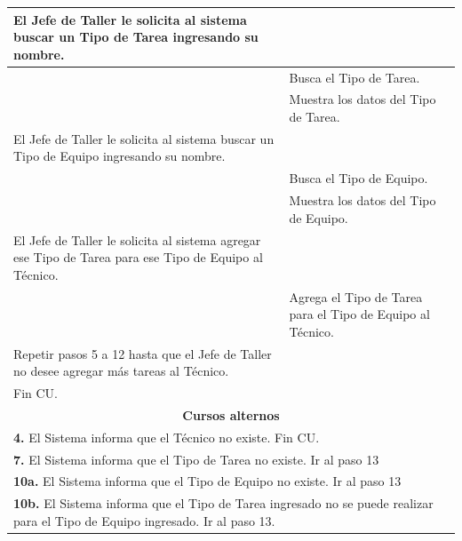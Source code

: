 \documentclass[12pt]{extarticle}
\begin{document}
\begin{spacing}{1.2}
\begin{longtable}{ |p{8cm}|p{8cm}| }
			\inc El Jefe de Taller le solicita al sistema buscar un Tipo de Tarea ingresando su nombre. & \\
			\hline
			& \inc Busca el Tipo de Tarea. \\
			\hline
			& \inc Muestra los datos del Tipo de Tarea. \\
			\hline
			\inc  El Jefe de Taller le solicita al sistema buscar un Tipo de Equipo ingresando su nombre. & \\
			\hline


			& \inc Busca el Tipo de Equipo.\\
			\hline
			& \inc Muestra los datos del Tipo de Equipo. \\
			\hline
			\inc  El Jefe de Taller le solicita al sistema agregar ese Tipo de Tarea para ese Tipo de Equipo al Técnico. & \\
			\hline
			& \inc Agrega el Tipo de Tarea para el Tipo de Equipo al Técnico. \\
			\hline


			\inc  Repetir pasos 5 a 12 hasta que el Jefe de Taller no desee agregar más tareas al Técnico. & \\
			\hline
			\inc Fin CU. & \\
		\hline
		\multicolumn{2}{|c|}{\textbf{Cursos alternos}}\\
		\hline
		\multicolumn{2}{|p{16cm}|}{\textbf{4. }El Sistema informa que el Técnico no existe. Fin CU.}\\
		\hline
		\multicolumn{2}{|p{16cm}|}{\textbf{7. }El Sistema informa que el Tipo de Tarea no existe. Ir al paso 13}\\
		\hline
		\multicolumn{2}{|p{16cm}|}{\textbf{10a. }El Sistema informa que el Tipo de Equipo no existe. Ir al paso 13}\\
		\hline	
		\multicolumn{2}{|p{16cm}|}{\textbf{10b. }El Sistema informa que el Tipo de Tarea ingresado no se puede realizar para el Tipo de Equipo ingresado. Ir al paso 13.}\\
		\hline	
	\end{longtable}

    \finCU{}



\end{spacing}
\end{document}
